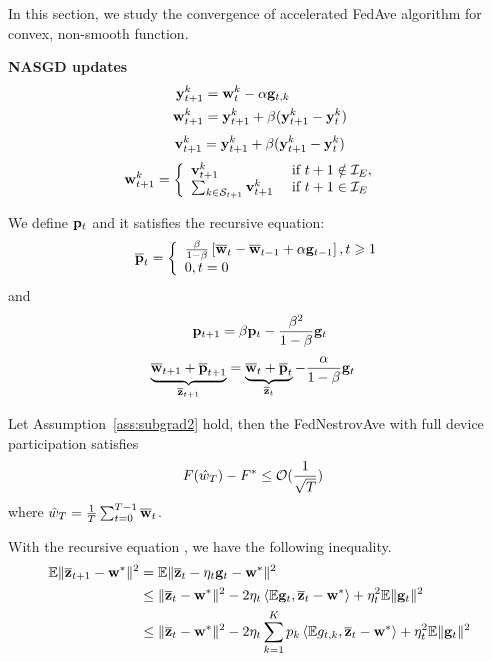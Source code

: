 
In this section, we study the convergence of accelerated FedAve 
algorithm for convex, non-smooth function.

\textbf{NASGD updates}
\begin{align}
	{\mathbf{y}}^k_{t+1} &= {\mathbf{w}}^k_{t} - \alpha  {\mathbf{g}}_{t,k}	\\
	{\mathbf{w}}^k_{t+1} & = {\mathbf{y}}^k_{t+1} + \beta({\mathbf{y}}^k_{t+1} - {\mathbf{y}}^k_{t})
\end{align}
$$ {\mathbf{v}}_{t+1}^{k} =  {\mathbf{y}}^k_{t+1} + \beta({\mathbf{y}}^k_{t+1} - {\mathbf{y}}^k_{t}) $$
\begin{align} 
\mathbf{w}_{t+1}^{k} &=\left\{\begin{array}{ll}\mathbf{v}_{t+1}^{k} & \text { if } t+1 \notin \mathcal{I}_{E}, \\ 
\sum_{k \in {\mathcal{S}}_{t+1}} \mathbf{v}_{t+1}^{k} & \text { if } t+1 \in \mathcal{I}_{E}\end{array}\right.
\end{align}

We define ${\mathbf{p}}_t$ and it satisfies the recursive equation:
\begin{align}
	{\overline{\mathbf{p}}}_{t}=\left\{\begin{array}{l}\frac{\beta}{1-\beta}\left[{\overline{\mathbf{w}}}_{t}-{\overline{\mathbf{w}}}_{t-1}+\alpha {\mathbf{g}}_{t-1}\right], t \geqslant 1 \\ 0, t=0\end{array}\right.
\end{align}
and 
\begin{align}
	{\mathbf{p}}_{t+1} =  \beta {\mathbf{p}}_t - \frac{\beta^2}{1 - \beta} {\mathbf{g}}_t
	\label{eq:recursivep}
\end{align}
\begin{align}
	\underbrace{\overline{{\mathbf{w}}}_{t+1} + \overline{{\mathbf{p}}}_{t+1}}_{\overline{{\mathbf{z}}}_{t+1}} &= \underbrace{\overline{{\mathbf{w}}}_{t} + \overline{{\mathbf{p}}}_{t}}_{\overline{{\mathbf{z}}}_{t}} - \frac{\alpha}{1- \beta} {\mathbf{g}}_t
	\label{eq:nasgdzt}
\end{align}


\begin{theorem}
	Let Assumption~\ref{ass:subgrad2} hold, 
	then the FedNestrovAve with full device participation satisfies
	\begin{align}
		 F(\hat{w}_T) - F^* &\leq {\mathcal{O}}(\frac{1}{\sqrt{T} })
	\end{align}
	where $\hat{w}_T = \frac{1}{T}\sum_{t=0}^{T-1} {\overline{\mathbf{w}}}_t$.
	\label{th:nasgcvxnonsmoth}
\end{theorem}

With the recursive equation \eq{\ref{eq:nasgdzt}}, we have the following 
inequality.
\begin{align}
	\mathbb{E}\|\overline{{\mathbf{z}}}_{t+1} - {\mathbf{w}}^* \|^2  &= \mathbb{E}\|\overline{{\mathbf{z}}}_{t} - \eta_t{\mathbf{g}}_t - {\mathbf{w}}^* \|^2 \\
& \leq  \| \overline{{\mathbf{z}}}_{t} - {\mathbf{w}}^*\|^2  - 2\eta_t\left<\mathbb{E}{\mathbf{g}}_t, \overline{{\mathbf{z}}}_{t} - {\mathbf{w}}^*\right> +  \eta_t^2\mathbb{E}\|{\mathbf{g}}_t\|^2 \\
& \leq  \| \overline{{\mathbf{z}}}_{t} - {\mathbf{w}}^*\|^2  - 2\eta_t\sum_{k=1}^K p_k\left<\mathbb{E} g_{t,k}, \overline{{\mathbf{z}}}_{t} - {\mathbf{w}}^*\right> +  \eta_t^2\mathbb{E}\|{\mathbf{g}}_t\|^2 \label{eq:nagcvx1}
\end{align}

